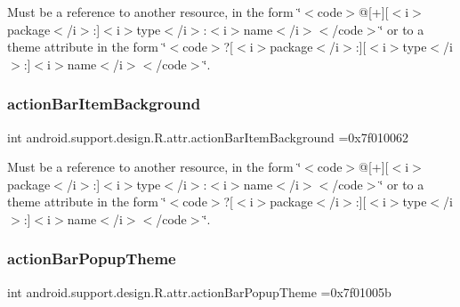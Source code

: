 Must be a reference to another resource, in the form \char`\"{}$<$code$>$@\mbox{[}+\mbox{]}\mbox{[}$<$i$>$package$<$/i$>$\+:\mbox{]}$<$i$>$type$<$/i$>$\+:$<$i$>$name$<$/i$>$$<$/code$>$\char`\"{} or to a theme attribute in the form \char`\"{}$<$code$>$?\mbox{[}$<$i$>$package$<$/i$>$\+:\mbox{]}\mbox{[}$<$i$>$type$<$/i$>$\+:\mbox{]}$<$i$>$name$<$/i$>$$<$/code$>$\char`\"{}. \mbox{\label{classandroid_1_1support_1_1design_1_1R_1_1attr_a39a183fd8748721aaa4fa22a492f13da}} 
\subsubsection{\texorpdfstring{action\+Bar\+Item\+Background}{actionBarItemBackground}}
{\footnotesize\ttfamily int android.\+support.\+design.\+R.\+attr.\+action\+Bar\+Item\+Background =0x7f010062\hspace{0.3cm}{\ttfamily [static]}}

Must be a reference to another resource, in the form \char`\"{}$<$code$>$@\mbox{[}+\mbox{]}\mbox{[}$<$i$>$package$<$/i$>$\+:\mbox{]}$<$i$>$type$<$/i$>$\+:$<$i$>$name$<$/i$>$$<$/code$>$\char`\"{} or to a theme attribute in the form \char`\"{}$<$code$>$?\mbox{[}$<$i$>$package$<$/i$>$\+:\mbox{]}\mbox{[}$<$i$>$type$<$/i$>$\+:\mbox{]}$<$i$>$name$<$/i$>$$<$/code$>$\char`\"{}. \mbox{\label{classandroid_1_1support_1_1design_1_1R_1_1attr_a0f8b2d84f24c78d7da114bc3055a921a}} 
\subsubsection{\texorpdfstring{action\+Bar\+Popup\+Theme}{actionBarPopupTheme}}
{\footnotesize\ttfamily int android.\+support.\+design.\+R.\+attr.\+action\+Bar\+Popup\+Theme =0x7f01005b\hspace{0.3cm}{\ttfamily [static]}}

